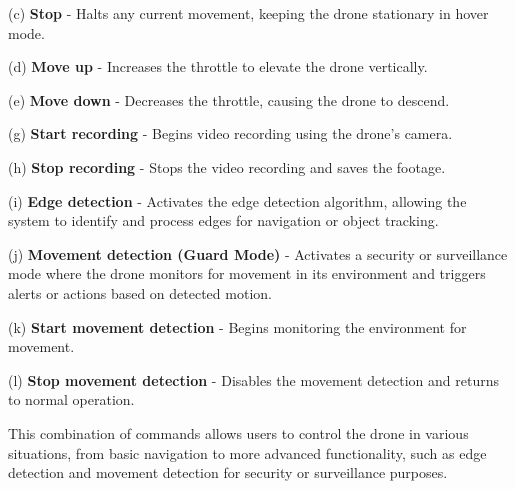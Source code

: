 \documentclass[unnumsec,webpdf,modern,large]{mam-authoring-template}%
\begin{document}
(c) \textbf{Stop} - Halts any current movement, keeping the drone stationary in hover mode.

(d) \textbf{Move up} - Increases the throttle to elevate the drone vertically.

(e) \textbf{Move down} - Decreases the throttle, causing the drone to descend.

(g) \textbf{Start recording} - Begins video recording using the drone's camera.

(h) \textbf{Stop recording} - Stops the video recording and saves the footage.

(i) \textbf{Edge detection} - Activates the edge detection algorithm, allowing the system to identify and process edges for navigation or object tracking.

(j) \textbf{Movement detection (Guard Mode)} - Activates a security or surveillance mode where the drone monitors for movement in its environment and triggers alerts or actions based on detected motion.

(k) \textbf{Start movement detection} - Begins monitoring the environment for movement.

(l) \textbf{Stop movement detection} - Disables the movement detection and returns to normal operation.

This combination of commands allows users to control the drone in various situations, from basic navigation to more advanced functionality, such as edge detection and movement detection for security or surveillance purposes.
\end{document}
